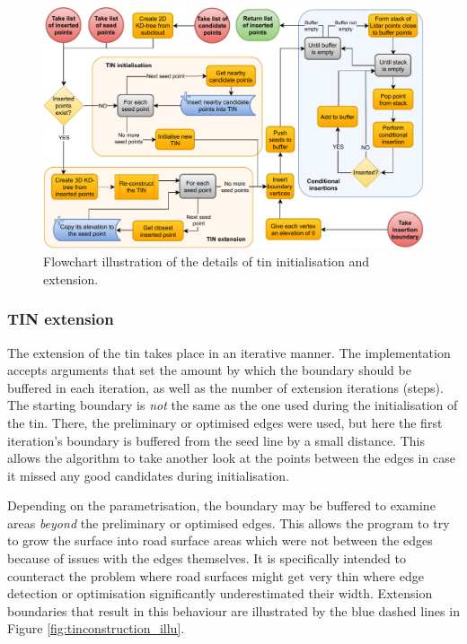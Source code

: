 \begin{figure}
    \centering
    \includegraphics[width=\linewidth]{final_report/figs/tin_construction_details.pdf}
    \caption[Flowchart illustrating the details of TIN initialisation and extension]{Flowchart illustration of the details of \ac{tin} initialisation and extension.}
    \label{fig:tinconstructiondetailsflow}
\end{figure}

\subsubsection{TIN extension}

The extension of the \ac{tin} takes place in an iterative manner. The implementation accepts arguments that set the amount by which the boundary should be buffered in each iteration, as well as the number of extension iterations (steps). The starting boundary is \textit{not} the same as the one used during the initialisation of the \ac{tin}. There, the preliminary or optimised edges were used, but here the first iteration's boundary is buffered from the seed line by a small distance. This allows the algorithm to take another look at the points between the edges in case it missed any good candidates during initialisation.

Depending on the parametrisation, the boundary may be buffered to examine areas \textit{beyond} the preliminary or optimised edges. This allows the program to try to grow the surface into road surface areas which were not between the edges because of issues with the edges themselves. It is specifically intended to counteract the problem where road surfaces might get very thin where edge detection or optimisation significantly underestimated their width. Extension boundaries that result in this behaviour are illustrated by the blue dashed lines in Figure \ref{fig:tinconstruction_illu}.

